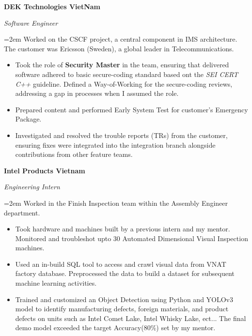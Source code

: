 \documentclass[10pt]{article}
\newcommand{\work}[4]{
  \noindent  \textbf{#1}
  \hfill 
\framebox{%
  \parbox{9em}{%
  \centering\textbf{#2}}} \par
  \noindent \textit{#3} \par
  \vspace*{0.5em}
  \noindent\hangindent=2em\hangafter=0 \small #4 
\normalsize \par}
\begin{document}
\work{DEK Technologies VietNam}
{Nov 2021--May 2023}
{Software Engineer}
{Worked on the CSCF project, a central component in IMS architecture.
 The customer was Ericsson (Sweden), a global leader in Telecommunications.

\begin{itemize}
    \item Took the role of \textbf{Security Master} in the team, ensuring that delivered software adhered to basic secure-coding standard based ont the \textit{SEI CERT C++} guideline.
     Defined a Way-of-Working for the secure-coding reviews, addressing a gap in processes when I assumed the role. 
    \item Prepared content and performed Early System Test for customer's Emergency Package.
    \item Investigated and resolved the trouble reports (TRs) from the customer, ensuring fixes were integrated into the integration branch alongside contributions from other feature teams.
\end{itemize}}


\work{Intel Products Vietnam}
{Aug 2020--Feb 2021}
{Engineering Intern}
{Worked in the Finish Inspection team within the Assembly Engineer department.
\begin{itemize}
    \item Took hardware and machines built by a previous intern and my mentor. 
    Monitored and troubleshot upto 30 Automated Dimensional Visual Inspection machines.
    \item Used an in-build SQL tool to access and crawl visual data from VNAT factory database. Preprocessed the data to build a dataset for subsequent machine learning activities.
    \item Trained and customized an Object Detection using Python and YOLOv3 model to identify manufacturing defects, foreign materials, and product defects on units such as Intel Comet Lake, Intel Whisky Lake, ect...
    The final demo model exceeded the target Accuracy(80\%) set by my mentor.
\end{itemize}}

\end{document}
